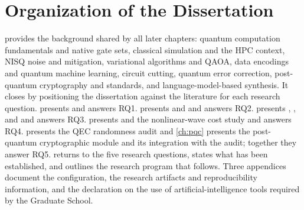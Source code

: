 \section{Organization of the Dissertation}\label{sec:intro:organization}

 provides the background shared by all later chapters: quantum computation fundamentals and native gate sets, classical simulation and the HPC context, NISQ noise and mitigation, variational algorithms and QAOA, data encodings and quantum machine learning, circuit cutting, quantum error correction, post-quantum cryptography and standards, and language-model-based synthesis. It closes by positioning the dissertation against the literature for each research question.  presents \qgear{} and answers RQ1.  presents \deal{} and \qawa{} and answers RQ2.  presents \qpie, \vqt, \shardq{} and \nnqa{} and answers RQ3.  presents \rubriq{} and the nonlinear-wave cost study and answers RQ4.  presents the QEC randomness audit and \cref{ch:pqc} presents the post-quantum cryptographic module and its integration with the audit; together they answer RQ5.  returns to the five research questions, states what has been established, and outlines the research program that follows. Three appendices document the \qgear{} configuration, the research artifacts and reproducibility information, and the declaration on the use of artificial-intelligence tools required by the Graduate School.
